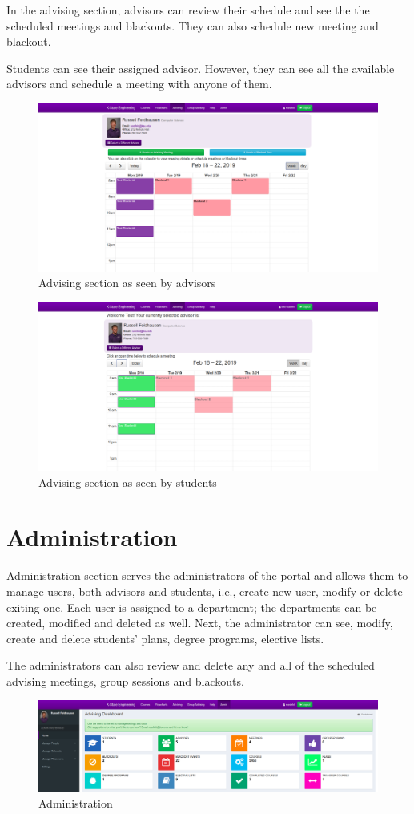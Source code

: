 \documentclass[12pt]{article}
\begin{document}
In the advising section, advisors can review their schedule and see the the scheduled meetings and blackouts. They can also schedule new meeting and blackout.

Students can see their assigned advisor. However, they can see all the available advisors and schedule a meeting with anyone of them.

\begin{figure}
    \centering
    \includegraphics[width=\textwidth]{advising-advisor.png}
    \caption{Advising section as seen by advisors}
    \label{fig:advisor}
\end{figure}

\begin{figure}
    \centering
    \includegraphics[width=\textwidth]{advising-student.png}
    \caption{Advising section as seen by students}
    \label{fig:student}
\end{figure}


\section{Administration}
Administration section serves the administrators of the portal and allows them to manage users, both advisors and students, i.e., create new user, modify or delete exiting one. Each user is assigned to a department; the departments can be created, modified and deleted as well. Next, the administrator can see, modify, create and delete students' plans, degree programs, elective lists.

The administrators can also review and delete any and all of the scheduled advising meetings, group sessions and blackouts.

\begin{figure}
    \centering
    \includegraphics[width=\textwidth]{administration.png}
    \caption{Administration}
    \label{fig:administration}
\end{figure}
\end{document}
